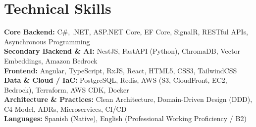 \section*{Technical Skills}

\noindent\textbf{Core Backend:} C\#, .NET, ASP.NET Core, EF Core, SignalR, RESTful APIs, Asynchronous Programming \\
\noindent\textbf{Secondary Backend \& AI:} NestJS, FastAPI (Python), ChromaDB, Vector Embeddings, Amazon Bedrock \\
\noindent\textbf{Frontend:} Angular, TypeScript, RxJS, React, HTML5, CSS3, TailwindCSS \\
\noindent\textbf{Data \& Cloud / IaC:} PostgreSQL, Redis, AWS (S3, CloudFront, EC2, Bedrock), Terraform, AWS CDK, Docker \\
\noindent\textbf{Architecture \& Practices:} Clean Architecture, Domain-Driven Design (DDD), C4 Model, ADRs, Microservices, CI/CD \\
\noindent\textbf{Languages:} Spanish (Native), English (Professional Working Proficiency / B2)